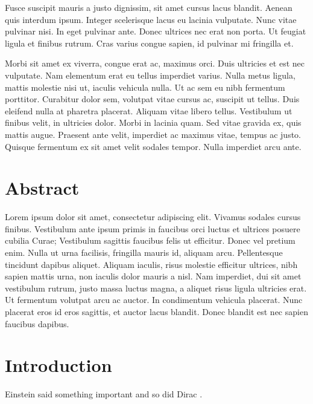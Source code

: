 Fusce suscipit mauris a justo dignissim, sit amet cursus lacus blandit. Aenean quis interdum ipsum. Integer scelerisque lacus eu lacinia vulputate. Nunc vitae pulvinar nisi. In eget pulvinar ante. Donec ultrices nec erat non porta. Ut feugiat ligula et finibus rutrum. Cras varius congue sapien, id pulvinar mi fringilla et.

Morbi sit amet ex viverra, congue erat ac, maximus orci. Duis ultricies et est nec vulputate. Nam elementum erat eu tellus imperdiet varius. Nulla metus ligula, mattis molestie nisi ut, iaculis vehicula nulla. Ut ac sem eu nibh fermentum porttitor. Curabitur dolor sem, volutpat vitae cursus ac, suscipit ut tellus. Duis eleifend nulla at pharetra placerat. Aliquam vitae libero tellus. Vestibulum ut finibus velit, in ultricies dolor. Morbi in lacinia quam. Sed vitae gravida ex, quis mattis augue. Praesent ante velit, imperdiet ac maximus vitae, tempus ac justo. Quisque fermentum ex sit amet velit sodales tempor. Nulla imperdiet arcu ante. 
\clearpage



\tableofcontents %
\clearpage




\section*{Abstract}
Lorem ipsum dolor sit amet, consectetur adipiscing elit. Vivamus sodales cursus finibus. Vestibulum ante ipsum primis in faucibus orci luctus et ultrices posuere cubilia Curae; Vestibulum sagittis faucibus felis ut efficitur. Donec vel pretium enim. Nulla ut urna facilisis, fringilla mauris id, aliquam arcu. Pellentesque tincidunt dapibus aliquet. Aliquam iaculis, risus molestie efficitur ultrices, nibh sapien mattis urna, non iaculis dolor mauris a nisl. Nam imperdiet, dui sit amet vestibulum rutrum, justo massa luctus magna, a aliquet risus ligula ultricies erat. Ut fermentum volutpat arcu ac auctor. In condimentum vehicula placerat. Nunc placerat eros id eros sagittis, et auctor lacus blandit. Donec blandit est nec sapien faucibus dapibus.


 

\section{Introduction}

Einstein said something important\cite{einstein} and so did Dirac \cite{dirac}.


